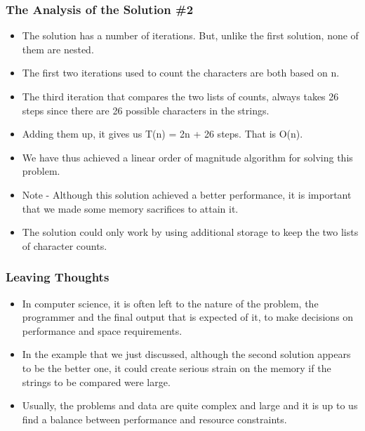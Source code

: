 \documentclass{beamer}
\begin{document}
\begin{frame}
\frametitle{The Analysis of the Solution 
\#2}
\begin{itemize}
\item The solution has a number of iterations. But, unlike the first solution, none of them
are nested. 
\item The first two iterations used to count the characters are both based on n.
\item The third iteration that compares the two lists of counts, always takes 26 steps since there are 26 possible characters in the strings.
\item Adding them up, it gives us T(n) = 2n + 26 steps. That is O(n).
\item We have thus achieved a linear order of magnitude algorithm for solving this problem.
\item Note - Although this solution achieved a better performance, it is important that we made some memory sacrifices to attain it.
\item The solution could only work by using additional storage to keep the two lists of character counts.
\end{itemize}
\end{frame}

\begin{frame}
\frametitle{Leaving Thoughts}
\begin{itemize}
\item In computer science, it is often left to the nature of the problem, the programmer and the final output that is expected of it, to make decisions on performance and space requirements.
\item In the example that we just discussed, although the second solution appears to be the better one, it could create serious strain on the memory if the strings to be compared were large.
\item Usually, the problems and data are quite complex and large and it is up to us find a balance between performance and resource constraints.
\end{itemize}
\end{frame}
\end{document}
